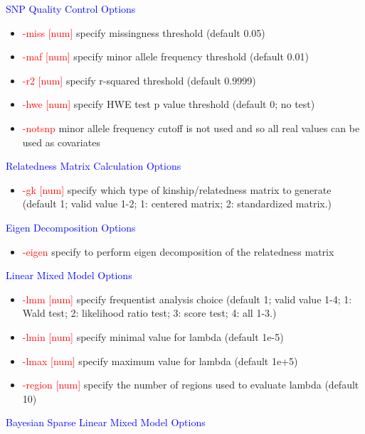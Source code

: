 \documentclass[11pt]{article}
\begin{document}
%
\textcolor{blue}{SNP Quality Control Options}
%
\begin{itemize}
\item  \textcolor{red}{-miss     [num] }     \quad          specify missingness threshold (default 0.05)
\item  \textcolor{red}{-maf      [num] }     \quad          specify minor allele frequency threshold (default 0.01)
\item  \textcolor{red}{-r2      [num] }     \quad           specify r-squared threshold (default 0.9999)
\item  \textcolor{red}{-hwe      [num] }     \quad           specify HWE test p value threshold (default 0; no test)
\item  \textcolor{red}{-notsnp  }     \quad          minor allele frequency cutoff is not used and so all real values can be used as covariates
\end{itemize}
%
\textcolor{blue}{Relatedness Matrix Calculation Options}
%
\begin{itemize}
\item  \textcolor{red}{-gk       [num]}     \quad           specify which type of kinship/relatedness matrix to generate (default 1; valid value 1-2; 1: centered matrix; 2: standardized matrix.)
\end{itemize}
%
\textcolor{blue}{Eigen Decomposition Options}
%
\begin{itemize}
\item  \textcolor{red}{-eigen}     \quad           specify to perform eigen decomposition of the relatedness matrix
\end{itemize}
%
\textcolor{blue}{Linear Mixed Model Options}
%
\begin{itemize}
\item  \textcolor{red}{-lmm       [num]}     \quad          specify frequentist analysis choice (default 1; valid value 1-4; 1: Wald test; 2: likelihood ratio test; 3: score test; 4: all 1-3.)
\item  \textcolor{red}{-lmin     [num] }     \quad          specify minimal value for lambda (default 1e-5)
\item  \textcolor{red}{-lmax     [num] }     \quad          specify maximum value for lambda (default 1e+5)
\item  \textcolor{red}{-region   [num]}     \quad           specify the number of regions used to evaluate lambda (default 10)
\end{itemize}
%
\textcolor{blue}{Bayesian Sparse Linear Mixed Model Options}
%
\end{document}
